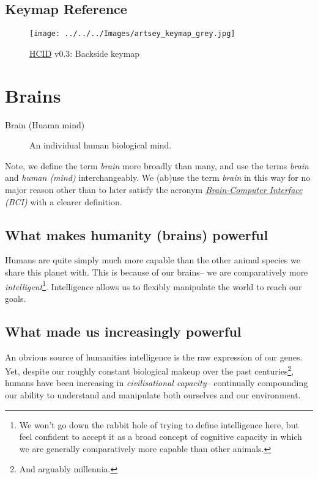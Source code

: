 \documentclass[logo,bsc,singlespacing,parskip]{infthesis}
\begin{document}
\section{Keymap Reference}
\label{sec:orgebd9893}
\begin{figure}[h]
\centering
\texttt{[image: ../../../Images/artsey\_keymap\_grey.jpg]}
\caption{\hyperref[org917851e]{HCID} v0.3: Backside keymap \autocite{ARTSEYEasyFast}}
\end{figure}

\chapter{Brains}
\label{sec:org60f878e}
\begin{mdframed}
\begin{description}
\item[{Brain\label{Brain} (Huamn mind\label{Human mind})}] An individual human biological mind.
\end{description}
\end{mdframed}

Note, we define the term \emph{brain} more broadly than many, and use the terms \emph{brain} and \emph{human (mind)} interchangeably.
We (ab)use the term \emph{brain} in this way for no major reason other than to later satisfy the acronym \emph{\hyperref[orgb0a773e]{Brain-Computer Interface} (BCI)} with a clearer definition.
\section{What makes humanity (brains) powerful}
\label{sec:org11329d5}
Humans are quite simply much more capable than the other animal species we share this planet with.
This is because of our brains-- we are comparatively more \emph{intelligent}\footnote{We won't go down the rabbit hole of trying to define intelligence here, but feel confident to accept it as a broad concept of cognitive capacity in which we are generally comparatively more capable than other animals.}.
Intelligence allows us to flexibly manipulate the world to reach our goals.

\section{What made us increasingly powerful}
\label{sec:orgbb0c393}
An obvious source of humanities intelligence is the raw expression of our genes.
Yet, despite our roughly constant biological makeup over the past centuries\footnote{And arguably millennia.}, humans have been increasing in \emph{civilisational capacity}--  continually compounding our ability to understand and manipulate both ourselves and our environment.
\end{document}
